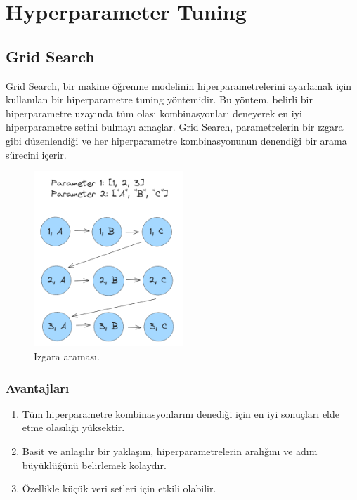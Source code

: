 \section{Hyperparameter Tuning}
\subsection{Grid Search}
Grid Search, bir makine öğrenme modelinin hiperparametrelerini ayarlamak için kullanılan bir hiperparametre tuning yöntemidir. Bu yöntem, belirli bir hiperparametre uzayında tüm olası kombinasyonları deneyerek en iyi hiperparametre setini bulmayı amaçlar. Grid Search, parametrelerin bir ızgara gibi düzenlendiği ve her hiperparametre kombinasyonunun denendiği bir arama sürecini içerir.

\begin{figure}[h]
    \centering
    \includegraphics[width=0.5\textwidth]{images/Grid_Search.png}
    \caption{Izgara araması.}
    \label{fig:enter-label}
\end{figure}

\subsubsection{Avantajları}
\begin{enumerate}
    \item Tüm hiperparametre kombinasyonlarını denediği için en iyi sonuçları elde etme olasılığı yüksektir.
    \item Basit ve anlaşılır bir yaklaşım, hiperparametrelerin aralığını ve adım büyüklüğünü belirlemek kolaydır.
    \item Özellikle küçük veri setleri için etkili olabilir.
\end{enumerate}

